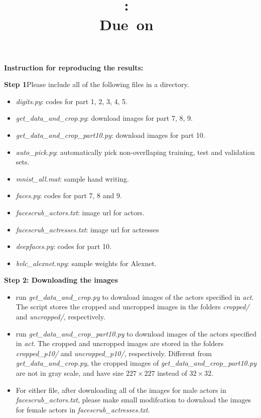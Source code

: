 \documentclass{article}
\title{
\vspace{2in}
\textmd{\textbf{\hmwkClass:\ \hmwkTitle}}\\
\normalsize\vspace{0.1in}\small{Due\ on\ \hmwkDueDate}\\
\vspace{0.1in}
\vspace{3in}
}
\author{\textbf{\hmwkAuthorName}}
\begin{document}
\maketitle
\clearpage
\textbf{Instruction for reproducing the results:}

\textbf{Step 1}Please include all of the following files in a directory.
\begin{itemize}
	\item \textit{digits.py}: codes for part 1, 2, 3, 4, 5.
	\item \textit{get\_data\_and\_crop.py}: download images for part 7, 8, 9.
	\item \textit{get\_data\_and\_crop\_part10.py}: download images for part 10.
	\item \textit{auto\_pick.py}: automatically pick non-overllaping training, test and validation sets.
	\item \textit{mnist\_all.mat}: sample hand writing.
	\item \textit{faces.py}: codes for part 7, 8 and 9.
	\item \textit{facescrub\_actors.txt}: image url for actors.
	\item \textit{facescrub\_actresses.txt}: image url for actresses
	\item \textit{deepfaces.py}: codes for part 10.
	\item \textit{bvlc\_alexnet.npy}: sample weights for Alexnet.
\end{itemize}
\textbf{Step 2: Downloading the images}
\begin{itemize}
	\item run \textit{get\_data\_and\_crop.py} to download images of the actors specified in \textit{act}. The script stores the cropped and uncropped images in the folders \textit{cropped/} and \textit{uncropped/}, respectively.
	\item run \textit{get\_data\_and\_crop\_part10.py}  to download images of the actors specified in \textit{act}. The cropped and uncropped images are stored in the folders \textit{cropped\_p10/} and \textit{uncropped\_p10/}, respectively. Different from \textit{get\_data\_and\_crop.py}, the cropped images of \textit{get\_data\_and\_crop\_part10.py} are not in gray scale, and have size $227\times227$ instead of $32\times32$.
	\item For either file, after downloading all of the images for male actors in \textit{facescrub\_actors.txt}, please make small modifcation to download the images for female actors in \textit{facescrub\_actresses.txt}.
\end{itemize}
\end{document}

